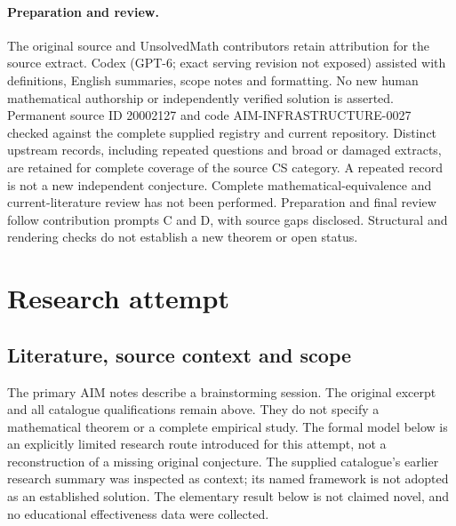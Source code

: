 \documentclass[11pt]{article}
\begin{document}
\paragraph{Preparation and review.}
The original source and UnsolvedMath contributors retain attribution for the source extract. Codex (GPT-6; exact serving revision not exposed) assisted with definitions, English summaries, scope notes and formatting. No new human mathematical authorship or independently verified solution is asserted. Permanent source ID 20002127 and code AIM-INFRASTRUCTURE-0027 checked against the complete supplied registry and current repository. Distinct upstream records, including repeated questions and broad or damaged extracts, are retained for complete coverage of the source CS category. A repeated record is not a new independent conjecture. Complete mathematical-equivalence and current-literature review has not been performed. Preparation and final review follow contribution prompts C and D, with source gaps disclosed. Structural and rendering checks do not establish a new theorem or open status.
\label{end:20002127}

\section{Research attempt}
\subsection{Literature, source context and scope}
The primary AIM notes describe a brainstorming session. The original excerpt and all catalogue qualifications remain above. They do not specify a mathematical theorem or a complete empirical study. The formal model below is an explicitly limited research route introduced for this attempt, not a reconstruction of a missing original conjecture. The supplied catalogue's earlier research summary was inspected as context; its named framework is not adopted as an established solution. The elementary result below is not claimed novel, and no educational effectiveness data were collected.
\end{document}
